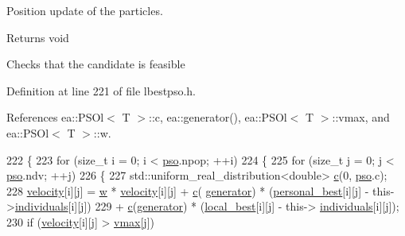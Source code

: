 Position update of the particles. 

\begin{DoxyReturn}{Returns}
void 
\end{DoxyReturn}
Checks that the candidate is feasible 

Definition at line 221 of file lbestpso.\+h.



References ea\+::\+P\+S\+Ol$<$ T $>$\+::c, ea\+::generator(), ea\+::\+P\+S\+Ol$<$ T $>$\+::vmax, and ea\+::\+P\+S\+Ol$<$ T $>$\+::w.


\begin{DoxyCode}
222     \{
223         \textcolor{keywordflow}{for} (\textcolor{keywordtype}{size\_t} i = 0; i < \hyperlink{classea_1_1_solver_3_01_p_s_ol_00_01_t_00_01_f_00_01_c_01_4_a3098f083ef04a0ce7ae0eef22dd80442}{pso}.npop; ++i)
224         \{
225             \textcolor{keywordflow}{for} (\textcolor{keywordtype}{size\_t} j = 0; j < \hyperlink{classea_1_1_solver_3_01_p_s_ol_00_01_t_00_01_f_00_01_c_01_4_a3098f083ef04a0ce7ae0eef22dd80442}{pso}.ndv; ++j)
226             \{
227                 std::uniform\_real\_distribution<double> \hyperlink{classea_1_1_solver__base_a6914e89d30e7484f2b4af1783f0de8c3}{c}(0, \hyperlink{classea_1_1_solver_3_01_p_s_ol_00_01_t_00_01_f_00_01_c_01_4_a3098f083ef04a0ce7ae0eef22dd80442}{pso}.c);
228                 \hyperlink{classea_1_1_solver_3_01_p_s_ol_00_01_t_00_01_f_00_01_c_01_4_ae8293610cb6bffc00e0fda749754a1f2}{velocity}[i][j] = \hyperlink{classea_1_1_solver_3_01_p_s_ol_00_01_t_00_01_f_00_01_c_01_4_a5c9d1a207892da92e2cf689b24c256ee}{w} * \hyperlink{classea_1_1_solver_3_01_p_s_ol_00_01_t_00_01_f_00_01_c_01_4_ae8293610cb6bffc00e0fda749754a1f2}{velocity}[i][j] + \hyperlink{classea_1_1_solver__base_a6914e89d30e7484f2b4af1783f0de8c3}{c}(
      \hyperlink{namespaceea_a385e8ca8ba4ae2f69dcfffa79f20c2ff}{generator}) * (\hyperlink{classea_1_1_solver_3_01_p_s_ol_00_01_t_00_01_f_00_01_c_01_4_a0738e0ab079273c4d34c827fad533868}{personal\_best}[i][j] - this->\hyperlink{classea_1_1_solver__base_ad75bc440d24a46e97694c7c889f2ecde}{individuals}[i][j])
229                     + \hyperlink{classea_1_1_solver__base_a6914e89d30e7484f2b4af1783f0de8c3}{c}(\hyperlink{namespaceea_a385e8ca8ba4ae2f69dcfffa79f20c2ff}{generator}) * (\hyperlink{classea_1_1_solver_3_01_p_s_ol_00_01_t_00_01_f_00_01_c_01_4_a6671c3d551564e3b4cd0944bfb2c33fd}{local\_best}[i][j] - this->
      \hyperlink{classea_1_1_solver__base_ad75bc440d24a46e97694c7c889f2ecde}{individuals}[i][j]);
230                 \textcolor{keywordflow}{if} (\hyperlink{classea_1_1_solver_3_01_p_s_ol_00_01_t_00_01_f_00_01_c_01_4_ae8293610cb6bffc00e0fda749754a1f2}{velocity}[i][j] > \hyperlink{classea_1_1_solver_3_01_p_s_ol_00_01_t_00_01_f_00_01_c_01_4_abd93da2229dac4eb2d11f4904a65ae9a}{vmax}[j])

\end{DoxyCode}
